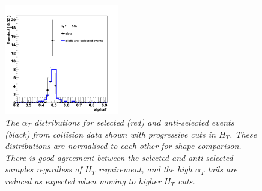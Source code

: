 \begin{figure}[h!]
\hspace*{3mm}
\includegraphics[width=50mm]{Plots/d-alphaT-6}
\caption{\textit{The $\alpha_{T}$ distributions for selected (red) and anti-selected events (black) from collision data shown with progressive cuts in $H_{T}$. These distributions are normalised to each other for shape comparison. There is good agreement between the selected and anti-selected samples regardless of $H_{T}$ requirement, and the high $\alpha_{T}$ tails are reduced as expected when moving to higher $H_{T}$ cuts.}}
\label{fig:datamc}
\end{figure}
